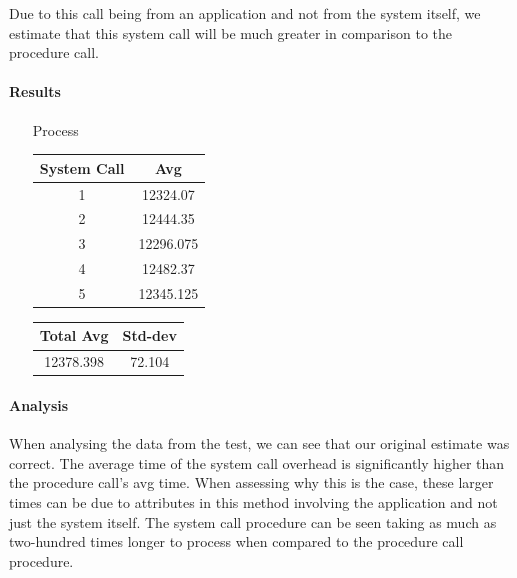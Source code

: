 Due to this call being from an application and not from the system itself, we estimate that this system call will be much greater in comparison to the procedure call.%

\paragraph{Results}

\begin{enumerate}
    \item [Process]
        \begin{center}
            \begin{tabular}{||c c||} 
             \hline
             System Call & Avg \\ [0.5ex] 
             \hline\hline
             1 & 12324.07  \\ 
             \hline
             2 & 12444.35  \\ 
             \hline
             3 & 12296.075  \\ 
             \hline
             4 & 12482.37 \\ 
             \hline
             5 & 12345.125  \\ 
             \hline
             \hline
            \end{tabular}
            \begin{tabular}{||c c||} 
                 \hline
                 Total Avg & Std-dev \\ [0.5ex] 
                 \hline\hline
                 12378.398 & 72.104\\ 
                 \hline
                \hline
            \end{tabular}
        \end{center}
\end{enumerate}

\paragraph{Analysis}

When analysing the data from the test, we can see that our original estimate was correct. The average time of the system call overhead is significantly higher than the procedure call's avg time. When assessing why this is the case, these larger times can be due to attributes in this method involving the application and not just the system itself. The system call procedure can be seen taking as much as two-hundred times longer to process when compared to the procedure call procedure.

